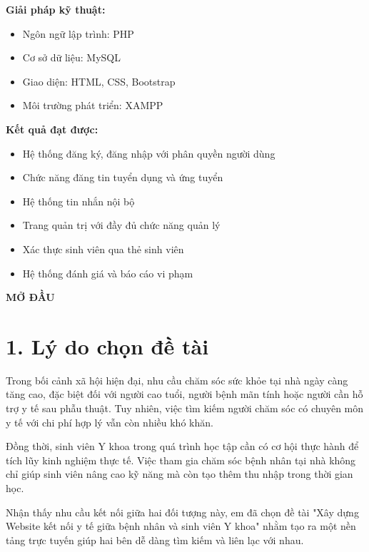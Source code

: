\documentclass[a4paper,12pt]{report}
\begin{document}
\textbf{Giải pháp kỹ thuật:}
\begin{itemize}
    \item Ngôn ngữ lập trình: PHP
    \item Cơ sở dữ liệu: MySQL
    \item Giao diện: HTML, CSS, Bootstrap
    \item Môi trường phát triển: XAMPP
\end{itemize}

\textbf{Kết quả đạt được:}
\begin{itemize}
    \item Hệ thống đăng ký, đăng nhập với phân quyền người dùng
    \item Chức năng đăng tin tuyển dụng và ứng tuyển
    \item Hệ thống tin nhắn nội bộ
    \item Trang quản trị với đầy đủ chức năng quản lý
    \item Xác thực sinh viên qua thẻ sinh viên
    \item Hệ thống đánh giá và báo cáo vi phạm
\end{itemize}

\newpage
{}
\begin{center}
\textbf{\Large MỞ ĐẦU}
\end{center}
\vspace{1cm}

\section*{1. Lý do chọn đề tài}

Trong bối cảnh xã hội hiện đại, nhu cầu chăm sóc sức khỏe tại nhà ngày càng tăng cao, đặc biệt đối với người cao tuổi, người bệnh mãn tính hoặc người cần hỗ trợ y tế sau phẫu thuật. Tuy nhiên, việc tìm kiếm người chăm sóc có chuyên môn y tế với chi phí hợp lý vẫn còn nhiều khó khăn.

Đồng thời, sinh viên Y khoa trong quá trình học tập cần có cơ hội thực hành để tích lũy kinh nghiệm thực tế. Việc tham gia chăm sóc bệnh nhân tại nhà không chỉ giúp sinh viên nâng cao kỹ năng mà còn tạo thêm thu nhập trong thời gian học.

Nhận thấy nhu cầu kết nối giữa hai đối tượng này, em đã chọn đề tài "Xây dựng Website kết nối y tế giữa bệnh nhân và sinh viên Y khoa" nhằm tạo ra một nền tảng trực tuyến giúp hai bên dễ dàng tìm kiếm và liên lạc với nhau.
\end{document}
